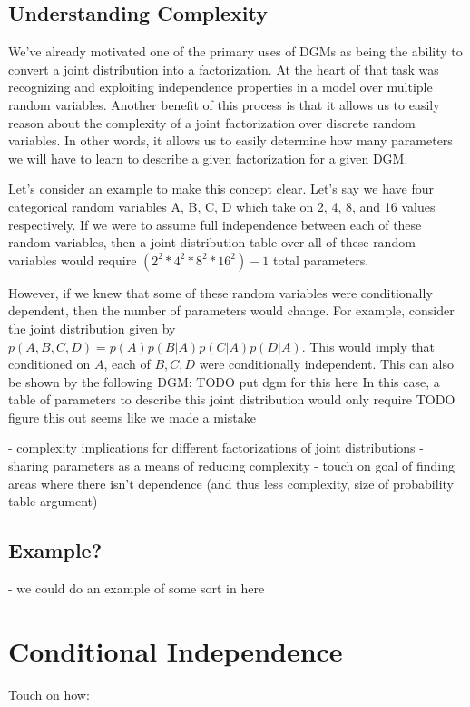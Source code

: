 \subsection{Understanding Complexity}
We've already motivated one of the primary uses of DGMs as being the ability to convert a joint distribution into a factorization. At the heart of that task was recognizing and exploiting independence properties in a model over multiple random variables. Another benefit of this process is that it allows us to easily reason about the complexity of a joint factorization over discrete random variables. In other words, it allows us to easily determine how many parameters we will have to learn to describe a given factorization for a given DGM.

Let's consider an example to make this concept clear. Let's say we have four categorical random variables A, B, C, D which take on 2, 4, 8, and 16 values respectively. If we were to assume full independence between each of these random variables, then a joint distribution table over all of these random variables would require $(2^2 * 4^2 * 8^2 * 16^2) - 1$ total parameters.


However, if we knew that some of these random variables were conditionally dependent, then the number of parameters would change. For example, consider the joint distribution given by $p(A, B, C, D) = p(A)p(B|A)p(C|A)p(D|A)$. This would imply that conditioned on $A$, each of $B, C, D$ were conditionally independent. This can also be shown by the following DGM:
TODO put dgm for this here
In this case, a table of parameters to describe this joint distribution would only require TODO figure this out seems like we made a mistake


- complexity implications for different factorizations of joint distributions
- sharing parameters as a means of reducing complexity
- touch on goal of finding areas where there isn't dependence (and thus less complexity, size of probability table argument)

\subsection{Example?}
- we could do an example of some sort in here

\section{Conditional Independence}
Touch on how:

